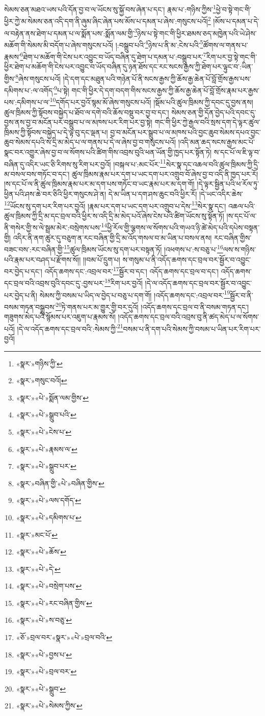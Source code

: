 སེམས་ཅན་མཐའ་ཡས་པའི་དོན་བྱ་བ་ལ་ཡོངས་སུ་སྐྱོ་བས་ཞེན་པ་དང་། རྣམ་པ་:གཉིས་ཀྱིས་\footnote{«སྣར་»གཉིས་ཀྱི་}ཕྱེ་བ་སྟེ་གང་གི་ཕྱིར་ཀྱེ་མ་སེམས་ཅན་འདི་དག་ནི་ཞུམ་ཞིང་ཞེན་པས་མོས་པ་དམན་པ་ཞེས་:གསུངས་པའོ།\footnote{«སྣར་»གསུང་བའོ།} །མོས་པ་དམན་པ་དེ་ལ་བརྟེན་ནས་ཐེག་པ་དམན་པ་ལ་སྨོན་པས་:སྨོན་ལམ་གྱི་\footnote{«སྣར་»«པེ་»སྨོན་ལམ་གྱིས་}ཉེས་པ་སྟེ་གང་གི་ཕྱིར་ཐམས་ཅད་མཁྱེན་པའི་ཡེ་ཤེས་མཆོག་གི་སེམས་མི་བདོག་པ་ཞེས་གསུངས་པའོ། །:བསྒྲུབ་པའི་\footnote{«སྣར་»«པེ་»སྒྲུབ་པའི་}ཉེས་པ་ནི་མ་:ངེས་པའི་\footnote{«སྣར་»«པེ་»ངེས་པ་}ཚོགས་ལ་གནས་པ་རྣམས་\footnote{«སྣར་»«པེ་»རྣམས་ལ་}ཐེག་པ་མཆོག་གི་ངེས་པར་འབྱུང་བ་ཡོད་བཞིན་དུ་ཐེག་པ་དམན་པ་:བསྒྲུབ་པར་\footnote{«སྣར་»«པེ་»སྒྲུབ་པར་}རིག་པར་བྱ་སྟེ་གང་གི་ཕྱིར་ཐེག་པ་མཆོག་གི་ངེས་པར་འབྱུང་བ་ཡོད་བཞིན་དུ་ཉན་ཐོས་དང་རང་སངས་རྒྱས་ཀྱི་ཐེག་པར་ལྟུང་བ་:ཡིན་གྱིས་\footnote{«སྣར་»བཞིན་གྱི་«པེ་»བཞིན་གྱིས་}ཞེས་གསུངས་པའོ། །དེ་དག་དང་མཐུན་པའི་གཉེན་པོ་ནི་སངས་རྒྱས་ཀྱི་ཆོས་རྒྱ་ཆེན་པོ་བློ་གྲོས་རྒྱས་པས་དམིགས་པ་:ལ་འགོད་\footnote{«སྣར་»«པེ་»ལས་དགོད་}པ་སྟེ། གང་གི་ཕྱིར་དེ་དག་བདག་གིས་སངས་རྒྱས་ཀྱི་ཆོས་རྒྱ་ཆེན་པོ་བློ་གྲོས་རྣམ་པར་རྒྱས་པས་:དམིགས་པ་ལ་\footnote{«སྣར་»«པེ་»དམིགས་པ་}དགོད་པར་བྱའོ་སྙམ་མོ་ཞེས་གསུངས་པའོ། །སྡོམ་པའི་ཚུལ་ཁྲིམས་ཀྱི་དབང་དུ་བྱས་ནས། ཚུལ་ཁྲིམས་ཀྱི་སྟོབས་བསྐྱེད་པ་ཐོབ་ལ་དགེ་བའི་ཆོས་བསྡུ་བར་བྱ་བ་དང་། སེམས་ཅན་གྱི་དོན་བྱེད་པའི་དབང་དུ་བྱས་ནས་བྱ་བ་མངོན་པར་བསྒྲུབ་པ་ལ་མཁས་པར་རིག་པར་བྱ་སྟེ། གང་གི་ཕྱིར་ཀྱེ་རྒྱལ་བའི་སྲས་དག་དེ་ལྟར་ཚུལ་ཁྲིམས་ཀྱི་སྟོབས་བསྐྱེད་པ་དེ་ལྟ་བུ་དང་ལྡན་པ། བྱ་བ་མངོན་པར་སྒྲུབ་པ་ལ་མཁས་པའི་བྱང་ཆུབ་སེམས་དཔའ་བྱང་ཆུབ་སེམས་དཔའི་ས་དྲི་མ་མེད་པ་ལ་གནས་པ་དེ་ལ་ཞེས་བྱ་བ་གསུངས་པའོ། །འདི་མན་ཆད་སངས་རྒྱས་མང་པོ་སྣང་བར་འགྱུར་ཞེས་བྱ་བ་ལ་སོགས་པའི་ཚིག་གིས་འབྲས་བུའི་ཕན་ཡོན་གྱི་ཁྱད་པར་སྟོན་ཏེ། ས་དང་པོ་ལ་ཇི་ལྟ་བ་བཞིན་དུ་འདིར་ཡང་ཅི་རིགས་སུ་རིག་པར་བྱའོ། །བསྐལ་པ་:མང་པོར་\footnote{«སྣར་»མང་པོ་}སེར་སྣ་དང་འཆལ་བའི་ཚུལ་ཁྲིམས་ཀྱི་དྲི་མ་བསལ་བས་གཏོང་བ་དང་། ཚུལ་ཁྲིམས་རྣམ་པར་དག་པ་ཡང་དག་པར་འགྲུབ་བོ་ཞེས་བྱ་བ་འདི་ནི་ཁྱད་པར་རོ། །ས་དང་པོ་ལ་ནི་ཚུལ་ཁྲིམས་རྣམ་པར་མ་དག་པས་གཏོང་བ་ཡང་རྣམ་པར་མ་དག་གོ། །དེ་ལྟར་སྦྱིན་པའི་ཕ་རོལ་ཏུ་ཕྱིན་པའི་ཤས་ཆེ་བར་ཅིའི་ཕྱིར་གསུངས་ཤེ་ན། དེ་མ་ཡིན་པ་དག་ཤས་ཆུང་བའི་ཕྱིར་རོ། །དེ་ཡང་འདིར་ཆེས་\footnote{«སྣར་»«པེ་»ཆོས་}ཡོངས་སུ་དག་པར་རིག་པར་བྱའོ། །རྣམ་པར་དག་པ་ཡང་དག་པར་འགྲུབ་པ་དེས་\footnote{«སྣར་»«པེ་»དེ་}སེར་སྣ་དང་། འཆལ་པའི་ཚུལ་ཁྲིམས་ཀྱི་དྲི་མ་དང་བྲལ་བའི་ཕྱིར་ས་འདི་དྲི་མ་མེད་པའོ་ཞེས་ངེས་པའི་ཚིག་ཡོངས་སུ་སྟོན་ཏོ། །ས་དང་པོ་ལ་ནི་གསེར་གྱི་ས་ལེ་སྦྲམ་མེར་:བསྲེགས་པས་\footnote{«སྣར་»«པེ་»བསྲེག་པས་}ཕྱི་རོལ་གྱི་ལྕགས་ལ་སོགས་པའི་གཡའ་ཉི་ཚེ་མེད་པའི་དཔེས་བསྟན་གྱི། འདིར་ནི་ནག་ཚུར་དུ་བཅུག་ན་རང་བཞིན་གྱི་དྲི་མ་འོད་གསལ་བ་མ་ཡིན་པ་བསལ་ནས། རང་བཞིན་གྱིས་བཟང་བས་:རང་བཞིན་གྱི་\footnote{«སྣར་»«པེ་»རང་བཞིན་གྱིས་}ཚུལ་ཁྲིམས་ཡོངས་སུ་དག་པར་བསྟན་ཏོ། །འཕགས་པ་:ས་བཅུ་པ་\footnote{«སྣར་»«པེ་»ས་བཅུ་}ལས་ས་གཉིས་པའི་རྣམ་པར་བཤད་པ་རྫོགས་སོ།། །།བམ་པོ་དྲུག་པ། ས་གསུམ་པ་ནི་འདོད་ཆགས་དང་བྲལ་བར་སྦྱོར་བ་འབྱུང་བར་བྱེད་པ་དང་། འདོད་ཆགས་དང་:འབྲལ་བར་\footnote{«ཅོ་»བྲལ་བར་«སྣར་»«པེ་»བྲལ་བའི་}སྦྱོར་བ་དང་། འདོད་ཆགས་དང་བྲལ་བ་དང་། འདོད་ཆགས་དང་བྲལ་བའི་འབྲས་བུའི་དབང་དུ་:བྱས་པར་\footnote{«སྣར་»«པེ་»བྱས་པ་}རིག་པར་བྱའོ། །དེ་ལ་འདོད་ཆགས་དང་བྲལ་བར་སྦྱོར་བ་འབྱུང་པར་བྱེད་པ་ནི། སེམས་ཀྱི་བསམ་པ་ཡིད་ལ་བྱེད་པ་བཅུ་པ་དག་གོ། །འདོད་ཆགས་དང་:འབྲལ་བར་\footnote{«སྣར་»«པེ་»བྲལ་བར་}སྦྱོར་བ་ནི་བསམ་གཏན་བསྒྲུབས་\footnote{«སྣར་»«པེ་»སྒྲུབ་}ཏེ་གནས་པར་མ་གྱུར་གྱི་བར་དུའོ། །འདོད་ཆགས་དང་བྲལ་བ་ནི་བསམ་གཏན་དང་། གཟུགས་མེད་པའི་སྙོམས་པར་འཇུག་པ་རྣམས་སོ། །འདོད་ཆགས་དང་བྲལ་བའི་འབྲས་བུ་ནི་ཚད་མེད་པ་ལ་སོགས་པའོ། །དེ་ལ་འདོད་ཆགས་དང་བྲལ་བའི་:སེམས་ཀྱི་\footnote{«སྣར་»«པེ་»སེམས་ཀྱིས་}བསམ་པ་ནི་དག་པའི་སེམས་ཀྱི་བསམ་པ་ཡིན་པར་རིག་པར་བྱའོ། 
